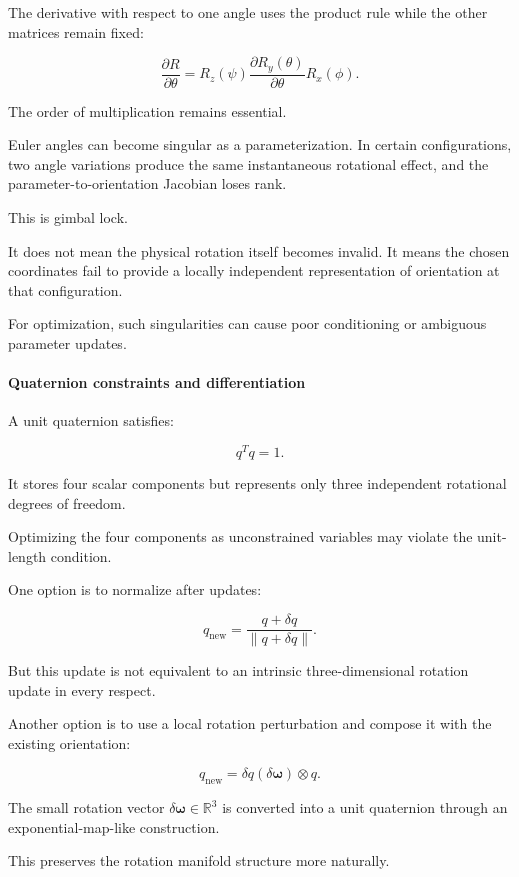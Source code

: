 The derivative with respect to one angle uses the product rule while the other matrices remain fixed:

\[
\frac{\partial R}{\partial\theta} = R_z(\psi) \frac{\partial R_y(\theta)}{\partial\theta} R_x(\phi).
\]

The order of multiplication remains essential.

Euler angles can become singular as a parameterization. In certain configurations, two angle variations produce the same instantaneous rotational effect, and the parameter-to-orientation Jacobian loses rank.

This is gimbal lock.

It does not mean the physical rotation itself becomes invalid. It means the chosen coordinates fail to provide a locally independent representation of orientation at that configuration.

For optimization, such singularities can cause poor conditioning or ambiguous parameter updates.

\paragraph{Quaternion constraints and differentiation}\label{02-foundations-ii-ch027-quaternion-constraints-and-differentiation}

A unit quaternion satisfies:

\[
q^Tq=1.
\]

It stores four scalar components but represents only three independent rotational degrees of freedom.

Optimizing the four components as unconstrained variables may violate the unit-length condition.

One option is to normalize after updates:

\[
q_{\mathrm{new}}= \frac{q+\delta q}{\|q+\delta q\|}.
\]

But this update is not equivalent to an intrinsic three-dimensional rotation update in every respect.

Another option is to use a local rotation perturbation and compose it with the existing orientation:

\[
q_{\mathrm{new}}= \delta q(\delta\boldsymbol\omega)\otimes q.
\]

The small rotation vector \(\delta\boldsymbol\omega\in\mathbb R^3\) is converted into a unit quaternion through an exponential-map-like construction.

This preserves the rotation manifold structure more naturally.

